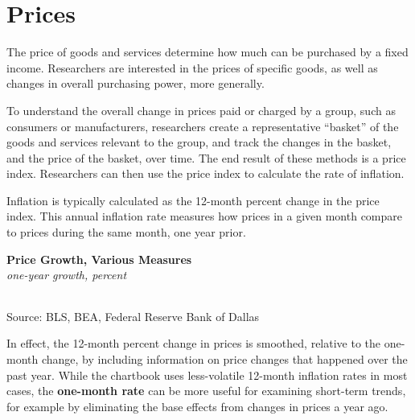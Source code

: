 \documentclass{report}
\begin{document}
{\begin{minipage}{0.76\textwidth}
\section*{Prices}
\vspace*{-2mm}

\small The price of goods and services determine how much can be purchased by a fixed income. Researchers are interested in the prices of specific goods, as well as changes in overall purchasing power, more generally.

To understand the overall change in prices paid or charged by a group, such as consumers or manufacturers, researchers create a representative ``basket'' of the goods and services relevant to the group, and track the changes in the basket, and the price of the basket, over time. The end result of these methods is a price index. Researchers can then use the price index to calculate the rate of inflation.

Inflation is typically calculated as the 12-month percent change in the price index. This annual inflation rate measures how prices in a given month compare to prices during the same month, one year prior. 
\vspace{1mm}

\normalsize \textbf{Price Growth, Various Measures}\\
\footnotesize{\textit{one-year growth, percent}}
\vspace*{-4mm}

\hspace*{-2mm}  \setlength{\tabcolsep}{3.1pt} \color{black!90}
	{\renewcommand{\arraystretch}{1.5}
		\begin{tabular}{p{30mm} R{7.6mm} R{7.6mm} R{7.6mm} R{7.6mm} R{7.6mm} R{7.6mm} 
		   R{9.2mm} R{8.5mm}}
			  \hline
		\end{tabular}}\vspace{-1mm}
		
\footnotesize{Source: BLS, BEA, Federal Reserve Bank of Dallas}
\vspace{2mm}

\small In effect, the 12-month percent change in prices is smoothed, relative to the one-month change, by including information on price changes that happened over the past year. While the chartbook uses less-volatile 12-month inflation rates in most cases, the \textbf{one-month rate} can be more useful for examining short-term trends, for example by eliminating the base effects from changes in prices a year ago. 


\end{minipage}}
\end{document}
